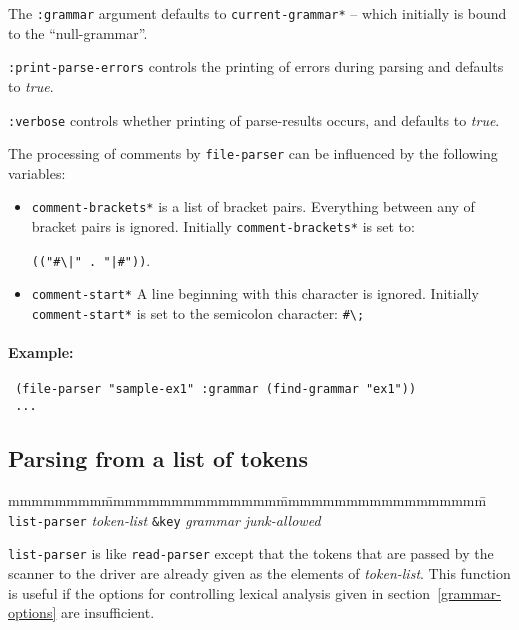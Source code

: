 The {\tt :grammar} argument defaults to {\tt *current-grammar*} -- which
initially is bound to the ``null-grammar''.

{\tt :print-parse-errors} controls the printing of errors during parsing and
defaults to {\em true}. 

{\tt :verbose} controls whether printing of parse-results occurs, and
defaults to {\em true}.

The processing of comments by {\tt file-parser} can be influenced by
the following variables: 
 

\begin{itemize}
  \item {\tt *comment-brackets*} is a list of bracket pairs. 
   Everything between any of bracket pairs is ignored.
   Initially {\tt *comment-brackets*} is set to:

            \verb+(("#\|" . "|#"))+. 

  \item {\tt *comment-start*}   A line beginning with this
   character is ignored.  Initially {\tt *comment-start*} is set to
   the semicolon character: \verb+#\;+ 
\end{itemize}

\paragraph{Example:}

{\tt \begin{verbatim}
 (file-parser "sample-ex1" :grammar (find-grammar "ex1"))
 ...
\end{verbatim}}


\subsection{Parsing from a list of tokens}

\begin{tabbing}
mmmmmmmm\=mmmmmmmmmmmmmmm\=mmmmmmmmmmmmmmmmmm\=\kill
{\tt list-parser} {\em token-list} {\tt \&key} {\em grammar} {\em junk-allowed} \>\> 
\end{tabbing}

{\tt list-parser} is like {\tt read-parser} except that the tokens
that are passed by the scanner to the driver are already given as the
elements of {\em token-list}.  This function is useful if the options for
controlling lexical analysis given in section~\ref{grammar-options}
are insufficient.

